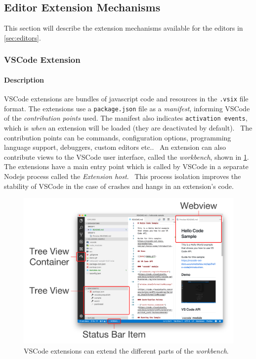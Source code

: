 \subsection{Editor Extension Mechanisms}\label{sec:extension-mechanisms}

This section will describe the extension mechanisms available for the editors in \cref{sec:editors}.

\subsubsection{VSCode Extension}\label{sec:vscode-extension}

\paragraph*{Description}
\Gls{VSCode} extensions are bundles of javascript code and resources in the \texttt{.vsix} file format.
The extensions use a \texttt{package.json} file as a \emph{manifest}, informing VSCode of the \emph{contribution points} used. 
The manifest also indicates \texttt{activation events}, which is \textit{when} an extension will be loaded (they are deactivated by default).~\cite{microsoftExtensionAnatomy2020}
The contribution points can be commands, configuration options, programming language support, debuggers, custom editors etc..~\cite{microsoftContributionPoints2020}
An extension can also contribute views to the VSCode user interface, called the \emph{workbench}, shown in \cref{fig:vscode-workbench-extension}.~\cite{microsoftExtendingWorkbench2020}
The extensions have a main entry point which is called by VSCode in a separate \gls{Nodejs} process called the \emph{Extension host}.~\cite{microsoftExtensionHost2020}
This process isolation improves the stability of VSCode in the case of crashes and hangs in an extension's code.\cite{microsoftExtensionsCapabilitiesOverview2020}

\begin{figure}[htbp]
  \centering
  \includegraphics[width=.5\textwidth]{figures/vscode-workbench-contribution.png}
  \caption[VSCode Workbench Extension]{VSCode extensions can extend the different parts of the \emph{workbench}.~\cite{microsoftExtendingWorkbench2020}}\label{fig:vscode-workbench-extension}
\end{figure}


